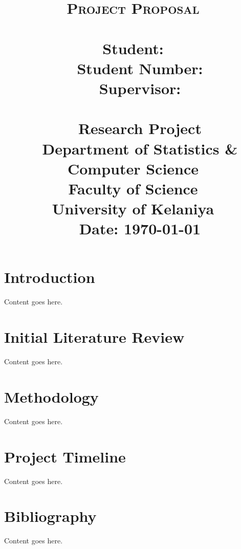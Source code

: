 \documentclass[11pt]{article}
\title{
    \thispagestyle{empty}
    \huge{\textsc{Project Proposal}\\[2\baselineskip]}
    \huge{\textbf{\provisionalTitle\\[2\baselineskip]}}
    \LARGE{\textbf{Student: } \studentName} \\ ~
    \LARGE{\textbf{Student Number: } \studentNumber } \\[3\baselineskip] ~
    \LARGE{\textbf{Supervisor: } \supervisorName} \\[5\baselineskip] ~
    \LARGE{\courseCode} \\ ~
    \LARGE{Research Project} \\[5\baselineskip] ~
    \LARGE{
        Department of Statistics \& Computer Science\\
        Faculty of Science\\
        University of Kelaniya
    } \\[1\baselineskip] ~
    \LARGE{
        Date: \today
    }
    \pagebreak
}
\author{}
\date{}
\newcommand{\sectionContentIntrodcution}{
    Content goes here.
}
\newcommand{\sectionContentInitialLiteratureReview}{
    Content goes here.
}
\newcommand{\sectionContentMethodology}{
    Content goes here.
}
\newcommand{\sectionContentProjectTimeline}{
    Content goes here.
}
\newcommand{\sectionContentBibliography}{
    Content goes here.
}
\begin{document}
\maketitle

\setcounter{page}{1}
\tableofcontents
\clearpage
\pagebreak

\section{Introduction}
    \sectionContentIntrodcution
\pagebreak

\section{Initial Literature Review}
    \sectionContentInitialLiteratureReview
\pagebreak

\section{Methodology}
    \sectionContentMethodology
\pagebreak

\section{Project Timeline}
    \sectionContentProjectTimeline
\pagebreak

\section{Bibliography}
    \sectionContentBibliography
\pagebreak
\end{document}
